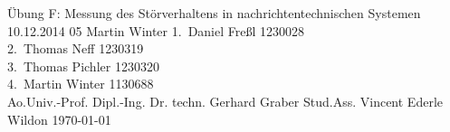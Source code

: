 \TUHeader                          %
{Übung F: Messung des Störverhaltens in nachrichtentechnischen Systemen}                       %
{10.12.2014}                        %
{05}                            %
{Martin Winter}                   %
{
1.~Daniel Freßl 1230028\\
2.~Thomas Neff 1230319\\                    %
3.~Thomas Pichler 1230320\\ 
4.~Martin Winter 1130688 \\                 %
}
{Ao.Univ.-Prof. Dipl.-Ing. Dr. techn. Gerhard Graber}
{Stud.Ass. Vincent Ederle}                          %
{Wildon}                              %
{\today}                            %




\pagebreak
  
\tableofcontents
  
\pagebreak